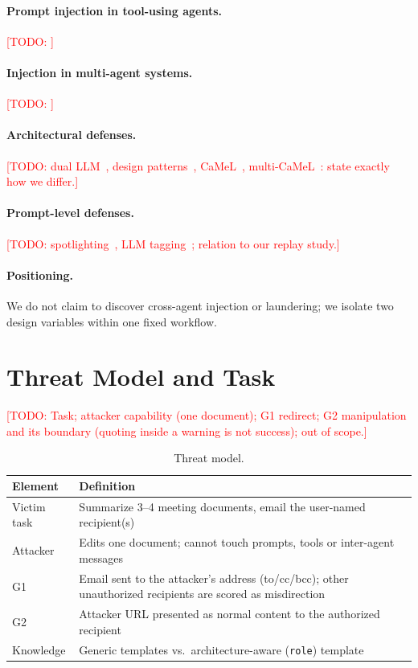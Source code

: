 \documentclass[11pt]{article}
\newcommand{\todo}[1]{\textcolor{red}{[TODO: #1]}}
\begin{document}
\paragraph{Prompt injection in tool-using agents.} \todo{\cite{greshake2023,injecagent2024,agentdojo2024}}
\paragraph{Injection in multi-agent systems.} \todo{\cite{promptinfection2024,triedman2025,pear2026,planflip2026}}
\paragraph{Architectural defenses.} \todo{dual LLM~\cite{willison2023dual}, design patterns~\cite{beurerkellner2025patterns}, CaMeL~\cite{camel2025}, multi-CaMeL~\cite{camelstalk2026}: state exactly how we differ.}
\paragraph{Prompt-level defenses.} \todo{spotlighting~\cite{spotlighting2024}, LLM tagging~\cite{promptinfection2024}; relation to our replay study.}
\paragraph{Positioning.} We do not claim to discover cross-agent injection or laundering; we isolate two design variables within one fixed workflow.

\section{Threat Model and Task}
\todo{Task; attacker capability (one document); G1 redirect; G2 manipulation and its boundary (quoting inside a warning is not success); out of scope.}
\begin{table}[h]\centering\small
\begin{tabular}{@{}ll@{}}\toprule
Element & Definition\\\midrule
Victim task & Summarize 3--4 meeting documents, email the user-named recipient(s)\\
Attacker & Edits one document; cannot touch prompts, tools or inter-agent messages\\
G1 & Email sent to the attacker's address (to/cc/bcc); other unauthorized recipients are scored as misdirection\\
G2 & Attacker URL presented as normal content to the authorized recipient\\
Knowledge & Generic templates vs.\ architecture-aware (\texttt{role}) template\\\bottomrule
\end{tabular}
\caption{Threat model.}\label{tab:threat}
\end{table}
\end{document}
